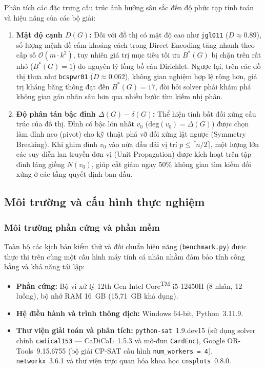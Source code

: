 \documentclass[a4paper,fleqn]{cas-sc}
\begin{document}
Phân tích các đặc trưng cấu trúc ảnh hưởng sâu sắc đến độ phức tạp tính toán và hiệu năng của các bộ giải:
\begin{enumerate}
    \item \textbf{Mật độ cạnh $D(G)$:} Đối với đồ thị có mật độ cao như \texttt{jgl011} ($D \approx 0.89$), số lượng mệnh đề cấm khoảng cách trong Direct Encoding tăng nhanh theo cấp số $\mathcal{O}(m \cdot k^2)$, tuy nhiên giá trị mục tiêu tối ưu $B^*(G)$ bị chặn trên rất nhỏ ($B^*(G) = 1$) do nguyên lý lồng bồ câu Dirichlet. Ngược lại, trên các đồ thị thưa như \texttt{bcspwr01} ($D \approx 0.062$), không gian nghiệm hợp lệ rộng hơn, giá trị kháng băng thông đạt đến $B^*(G) = 17$, đòi hỏi solver phải khám phá không gian gán nhãn sâu hơn qua nhiều bước tìm kiếm nhị phân.
    \item \textbf{Độ phân tán bậc đỉnh $\Delta(G) - \delta(G)$:} Thể hiện tính bất đối xứng cấu trúc của đồ thị. Đỉnh có bậc lớn nhất $v_0$ ($\text{deg}(v_0) = \Delta(G)$) được chọn làm đỉnh neo (pivot) cho kỹ thuật phá vỡ đối xứng lật ngược (Symmetry Breaking). Khi ghim đỉnh $v_0$ vào nửa đầu dải vị trí $p \le \lceil n/2 \rceil$, một lượng lớn các suy diễn lan truyền đơn vị (Unit Propagation) được kích hoạt trên tập đỉnh láng giềng $N(v_0)$, giúp cắt giảm ngay 50\% không gian tìm kiếm đối xứng ở các tầng quyết định ban đầu.
\end{enumerate}

\subsection{Môi trường và cấu hình thực nghiệm}

\subsubsection{Môi trường phần cứng và phần mềm}
Toàn bộ các kịch bản kiểm thử và đối chuẩn hiệu năng (\texttt{benchmark.py}) được thực thi trên cùng một cấu hình máy tính cá nhân nhằm đảm bảo tính công bằng và khả năng tái lập:
\begin{itemize}
    \item \textbf{Phần cứng:} Bộ vi xử lý 12th Gen Intel\textsuperscript{\textregistered} Core\textsuperscript{TM} i5-12450H (8 nhân, 12 luồng), bộ nhớ RAM 16~GB (15,71~GB khả dụng).
    \item \textbf{Hệ điều hành và trình thông dịch:} Windows 64-bit, Python~3.11.9.
    \item \textbf{Thư viện giải toán và phân tích:} \texttt{python-sat}~1.9.dev15 (sử dụng solver chính \texttt{cadical153} --- CaDiCaL~1.5.3 và mô-đun \texttt{CardEnc}), Google OR-Tools~9.15.6755 (bộ giải CP-SAT cấu hình \texttt{num\_workers = 4}), \texttt{networkx}~3.6.1 và thư viện trực quan hóa khoa học \texttt{cnsplots}~0.8.0.
\end{itemize}
\end{document}

